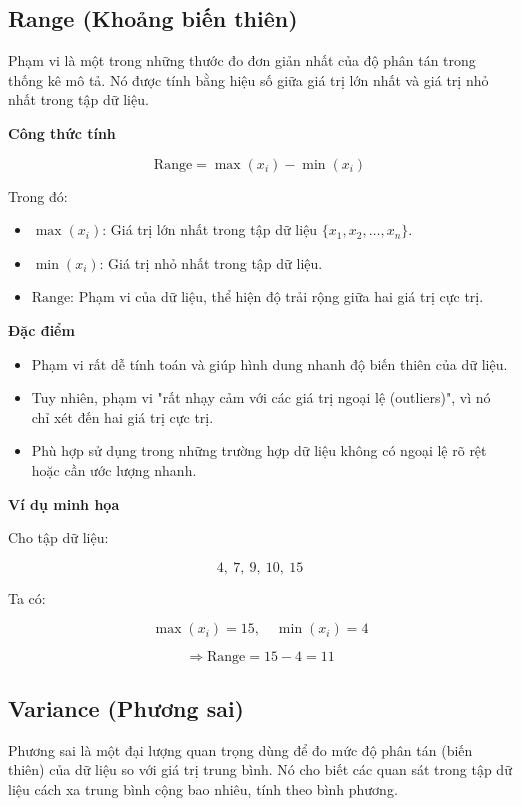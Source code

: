 \subsection {Range (Khoảng biến thiên)}
\label{stat:range}

Phạm vi là một trong những thước đo đơn giản nhất của độ phân tán trong thống kê mô tả. Nó được tính bằng hiệu số giữa giá trị lớn nhất và giá trị nhỏ nhất trong tập dữ liệu.

\textbf{Công thức tính}

\begin{equation}
    \text{Range} = \max(x_i) - \min(x_i)
    \tag{2.4}
\end{equation}

\noindent
Trong đó:
\begin{itemize}
    \item \( \max(x_i) \): Giá trị lớn nhất trong tập dữ liệu \( \{x_1, x_2, \ldots, x_n\} \).
    \item \( \min(x_i) \): Giá trị nhỏ nhất trong tập dữ liệu.
    \item \( \text{Range} \): Phạm vi của dữ liệu, thể hiện độ trải rộng giữa hai giá trị cực trị.
\end{itemize}

\textbf{Đặc điểm}
\begin{itemize}
    \item Phạm vi rất dễ tính toán và giúp hình dung nhanh độ biến thiên của dữ liệu.
    \item Tuy nhiên, phạm vi "rất nhạy cảm với các giá trị ngoại lệ (outliers)", vì nó chỉ xét đến hai giá trị cực trị.
    \item Phù hợp sử dụng trong những trường hợp dữ liệu không có ngoại lệ rõ rệt hoặc cần ước lượng nhanh.
\end{itemize}

\textbf{Ví dụ minh họa}

Cho tập dữ liệu:

\[
    4,\ 7,\ 9,\ 10,\ 15
\]

\noindent
Ta có:

\[
    \max(x_i) = 15,\quad \min(x_i) = 4
\]

\[
    \Rightarrow \text{Range} = 15 - 4 = 11
\]


\subsection {Variance (Phương sai)}
\label{stat:var}

Phương sai là một đại lượng quan trọng dùng để đo mức độ phân tán (biến thiên) của dữ liệu so với giá trị trung bình. Nó cho biết các quan sát trong tập dữ liệu cách xa trung bình cộng bao nhiêu, tính theo bình phương.

